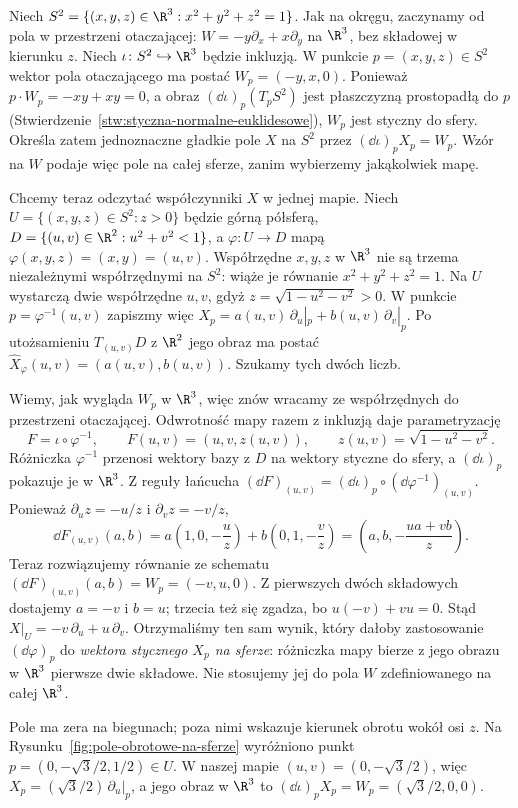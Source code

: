 \begin{przyklad}
Niech $S^2=\{(x,y,z)\in\R^3:x^2+y^2+z^2=1\}$.
Jak na okręgu, zaczynamy od pola w przestrzeni otaczającej:
$W=-y\partial_x+x\partial_y$ na $\R^3$, bez składowej
w kierunku $z$. Niech $\iota\colon S^2\hookrightarrow\R^3$
będzie inkluzją. W punkcie $p=(x,y,z)\in S^2$ wektor pola
otaczającego ma postać $W_p=(-y,x,0)$. Ponieważ
$p\cdot W_p=-xy+xy=0$, a obraz $(\dd\iota)_p(T_pS^2)$
jest płaszczyzną prostopadłą do $p$
(Stwierdzenie~\ref{stw:styczna-normalne-euklidesowe}),
$W_p$ jest styczny
do sfery. Określa zatem jednoznaczne gładkie pole $X$ na
$S^2$ przez $(\dd\iota)_pX_p=W_p$. Wzór na $W$ podaje
więc pole na całej sferze, zanim wybierzemy jakąkolwiek mapę.

Chcemy teraz odczytać współczynniki $X$ w jednej mapie.
Niech $U=\{(x,y,z)\in S^2:z>0\}$ będzie górną półsferą,
$D=\{(u,v)\in\R^2:u^2+v^2<1\}$, a
$\varphi\colon U\to D$ mapą $\varphi(x,y,z)=(x,y)=(u,v)$.
Współrzędne $x,y,z$ w $\R^3$ nie są trzema niezależnymi
współrzędnymi na $S^2$: wiąże je równanie $x^2+y^2+z^2=1$.
Na $U$ wystarczą dwie współrzędne $u,v$, gdyż
$z=\sqrt{1-u^2-v^2}>0$. W punkcie
$p=\varphi^{-1}(u,v)$ zapiszmy więc
$X_p=a(u,v)\,\partial_u|_p+b(u,v)\,\partial_v|_p$.
Po utożsamieniu $T_{(u,v)}D$ z $\R^2$ jego obraz ma postać
$\widehat X_\varphi(u,v)=(a(u,v),b(u,v))$.
Szukamy tych dwóch liczb.

Wiemy, jak wygląda $W_p$ w $\R^3$, więc znów wracamy ze
współrzędnych do przestrzeni otaczającej. Odwrotność mapy
razem z inkluzją daje parametryzację
\[
F=\iota\circ\varphi^{-1},\qquad
F(u,v)=(u,v,z(u,v)),\qquad
z(u,v)=\sqrt{1-u^2-v^2}.
\]
Różniczka $\varphi^{-1}$ przenosi wektory bazy z $D$
na wektory styczne do sfery, a $(\dd\iota)_p$ pokazuje je
w $\R^3$. Z reguły łańcucha
$(\dd F)_{(u,v)}=(\dd\iota)_p\circ(\dd\varphi^{-1})_{(u,v)}$.
Ponieważ $\partial_u z=-u/z$ i $\partial_v z=-v/z$,
\[
\dd F_{(u,v)}(a,b)
=a\left(1,0,-\frac{u}{z}\right)
 +b\left(0,1,-\frac{v}{z}\right)
=\left(a,b,-\frac{ua+vb}{z}\right).
\]
Teraz rozwiązujemy równanie ze schematu
$(\dd F)_{(u,v)}(a,b)=W_p=(-v,u,0)$.
Z pierwszych dwóch składowych dostajemy $a=-v$ i $b=u$;
trzecia też się zgadza, bo $u(-v)+vu=0$.
Stąd $X|_U=-v\,\partial_u+u\,\partial_v$.
Otrzymaliśmy ten sam wynik, który dałoby zastosowanie
$(\dd\varphi)_p$ do \emph{wektora stycznego $X_p$ na sferze}:
różniczka mapy bierze z jego obrazu w $\R^3$ pierwsze
dwie składowe. Nie stosujemy jej do pola $W$ zdefiniowanego
na całej $\R^3$.

Pole ma zera na biegunach; poza nimi wskazuje kierunek obrotu
wokół osi $z$. Na Rysunku~\ref{fig:pole-obrotowe-na-sferze}
wyróżniono punkt $p=(0,-\sqrt3/2,1/2)\in U$.
W naszej mapie $(u,v)=(0,-\sqrt3/2)$, więc
$X_p=(\sqrt3/2)\,\partial_u|_p$, a jego obraz w $\R^3$ to
$(\dd\iota)_pX_p=W_p=(\sqrt3/2,0,0)$.
\end{przyklad}

